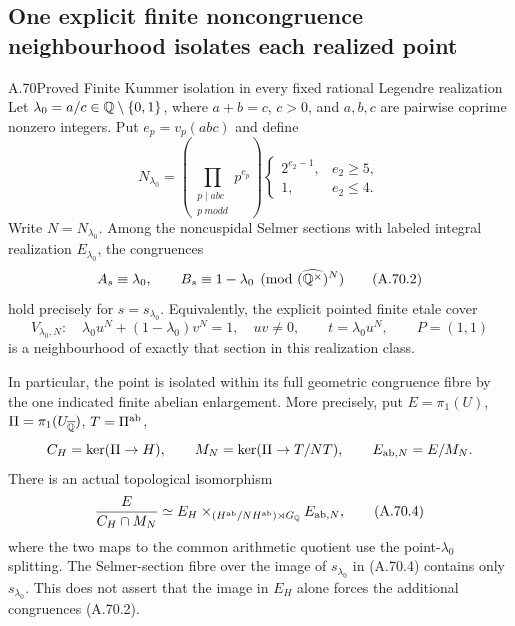 \subsection[Finite noncongruence isolation of each realized point]{One explicit finite noncongruence neighbourhood isolates each realized point}

\begin{statement}{A.70}{Proved}
{Finite Kummer isolation in every fixed rational Legendre realization}
Let $\lambda_0=a/c\in\mathbb Q\setminus\{0,1\}$, where
$a+b=c$, $c>0$, and $a,b,c$ are pairwise coprime nonzero
integers.  Put $e_p=v_p(abc)$ and define
\[
 N_{\lambda_0}=
 \left(\prod_{\substack{p\mid abc\\p\ {
m odd}}}p^{e_p}\right)
 \begin{cases}
       2^{e_2-1},&e_2\ge5,\\
       1,&e_2\le4.
 \end{cases}
\tag{A.70.1}
\]
Write $N=N_{\lambda_0}$.
Among the noncuspidal Selmer sections with labeled integral
realization $E_{\lambda_0}$, the congruences
\[
             A_s\equiv\lambda_0,\qquad
             B_s\equiv1-\lambda_0
                       \pmod{(\widehat{\mathbb Q^\times})^N}
\tag{A.70.2}
\]
hold precisely for $s=s_{\lambda_0}$.
Equivalently, the explicit pointed finite etale cover
\[
 V_{\lambda_0,N}:\quad
       \lambda_0u^N+(1-\lambda_0)v^N=1,\quad uv\ne0,
 \qquad t=\lambda_0u^N,\qquad P=(1,1)
\tag{A.70.3}
\]
is a neighbourhood of exactly that section in this
realization class.

In particular, the point is isolated within its full
geometric congruence fibre by the one indicated finite
abelian enlargement.  More precisely, put
$E=\pi_1(U)$, $\Pi=\pi_1(U_{\overline{\mathbb Q}})$,
$T=\Pi^{\rm ab}$,
\[
 C_H=\ker(\Pi\to H),\qquad
 M_N=\ker(\Pi\to T/NT),\qquad
 E_{{\rm ab},N}=E/M_N.
\]
There is an actual topological isomorphism
\[
 \frac{E}{C_H\cap M_N}
       \simeq
 E_H\mathbin{\times}_{(H^{\rm ab}/NH^{\rm ab})\rtimes G_\mathbb Q}
                         E_{{\rm ab},N},
\tag{A.70.4}
\]
where the two maps to the common arithmetic quotient use
the point-$\lambda_0$ splitting.
The Selmer-section fibre over the image of $s_{\lambda_0}$
in (A.70.4) contains only $s_{\lambda_0}$.
This does not assert that the image in $E_H$ alone forces
the additional congruences (A.70.2).
\end{statement}
